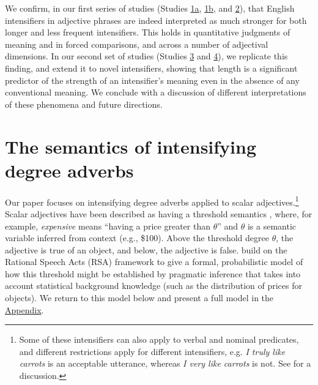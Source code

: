\documentclass[10pt,letterpaper]{article}
\newcommand{\w}[1]{\emph{#1}}
\begin{document}
We confirm, in our first series of studies (Studies \hyperref[sec:study1a]{1a}, \hyperref[sec:study1b]{1b}, and \hyperref[sec:study2]{2}), that English intensifiers in adjective phrases are indeed interpreted as much stronger for both longer and less frequent intensifiers.
This holds in quantitative judgments of meaning and in forced comparisons, and across a number of adjectival dimensions.
In our second set of studies (Studies \hyperref[sec:study3]{3} and \hyperref[sec:study4]{4}), we replicate this finding, and extend it to novel intensifiers, showing that length is a significant predictor of the strength of an intensifier's meaning even in the absence of any conventional meaning.
We conclude with a discussion of different interpretations of these phenomena and future directions.

\section{The semantics of intensifying degree adverbs \label{sec:semantics}}

Our paper focuses on intensifying degree adverbs applied to scalar adjectives.\footnote{
  Some of these intensifiers can also apply to verbal and nominal predicates, and different restrictions apply for different intensifiers, e.g. \w{I truly like carrots} is an acceptable utterance, whereas \w{I very like carrots} is not. See  for a discussion.
 }
Scalar adjectives have been described as having a threshold semantics \cite{kennedy_vagueness_2007}, where, for example, \w{expensive} means ``having a price greater than $\theta$'' and $\theta$ is a semantic variable inferred from context (e.g., \$100).
Above the threshold degree $\theta$, the adjective is true of an object, and below, the adjective is false.
 build on the Rational Speech Acts (RSA) framework \cite{frank_predicting_2012, goodman_knowledge_2013} to give a formal, probabilistic model of how this threshold might be established by pragmatic inference that takes into account statistical background knowledge (such as the distribution of prices for objects).
We return to this model below and present a full model in the \hyperref[app:model]{Appendix}.
\end{document}

